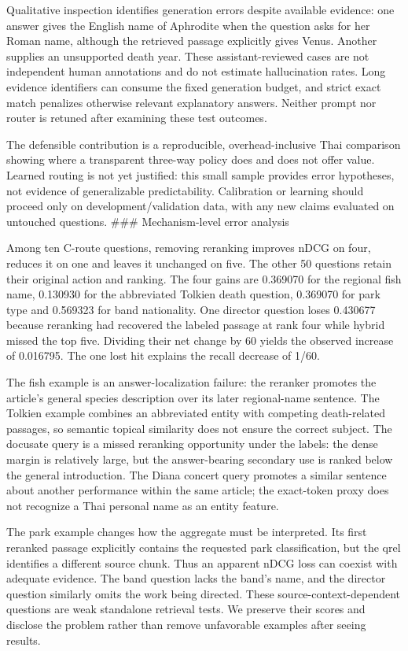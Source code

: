 Qualitative inspection identifies generation errors despite available
evidence: one answer gives the English name of Aphrodite when the
question asks for her Roman name, although the retrieved passage
explicitly gives Venus. Another supplies an unsupported death year.
These assistant-reviewed cases are not independent human annotations and
do not estimate hallucination rates. Long evidence identifiers can
consume the fixed generation budget, and strict exact match penalizes
otherwise relevant explanatory answers. Neither prompt nor router is
retuned after examining these test outcomes.

The defensible contribution is a reproducible, overhead-inclusive Thai
comparison showing where a transparent three-way policy does and does
not offer value. Learned routing is not yet justified: this small sample
provides error hypotheses, not evidence of generalizable predictability.
Calibration or learning should proceed only on development/validation
data, with any new claims evaluated on untouched questions. \#\#\#
Mechanism-level error analysis

Among ten C-route questions, removing reranking improves nDCG on four,
reduces it on one and leaves it unchanged on five. The other 50
questions retain their original action and ranking. The four gains are
0.369070 for the regional fish name, 0.130930 for the abbreviated
Tolkien death question, 0.369070 for park type and 0.569323 for band
nationality. One director question loses 0.430677 because reranking had
recovered the labeled passage at rank four while hybrid missed the top
five. Dividing their net change by 60 yields the observed increase of
0.016795. The one lost hit explains the recall decrease of 1/60.

The fish example is an answer-localization failure: the reranker
promotes the article's general species description over its later
regional-name sentence. The Tolkien example combines an abbreviated
entity with competing death-related passages, so semantic topical
similarity does not ensure the correct subject. The docusate query is a
missed reranking opportunity under the labels: the dense margin is
relatively large, but the answer-bearing secondary use is ranked below
the general introduction. The Diana concert query promotes a similar
sentence about another performance within the same article; the
exact-token proxy does not recognize a Thai personal name as an entity
feature.

The park example changes how the aggregate must be interpreted. Its
first reranked passage explicitly contains the requested park
classification, but the qrel identifies a different source chunk. Thus
an apparent nDCG loss can coexist with adequate evidence. The band
question lacks the band's name, and the director question similarly
omits the work being directed. These source-context-dependent questions
are weak standalone retrieval tests. We preserve their scores and
disclose the problem rather than remove unfavorable examples after
seeing results.

